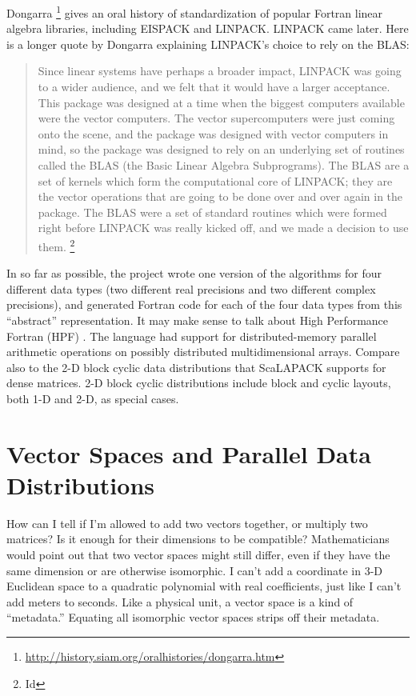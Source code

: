 Dongarra \footnote{\url{http://history.siam.org/oralhistories/dongarra.htm}}
gives an oral history of standardization of popular Fortran linear algebra
libraries, including EISPACK and LINPACK.  LINPACK came later.  Here is a longer
quote by Dongarra explaining LINPACK's choice to rely on the BLAS:

\begin{quote}
  Since linear systems have perhaps a broader impact, LINPACK was
  going to a wider audience, and we felt that it would have a larger acceptance.
  This package was designed at a time when the biggest computers available were
  the vector computers. The vector supercomputers were just coming onto the
  scene, and the package was designed with vector computers in mind, so the
  package was designed to rely on an underlying set of routines called the BLAS
  (the Basic Linear Algebra Subprograms). The BLAS are a set of kernels which
  form the computational core of LINPACK; they are the vector operations that
  are going to be done over and over again in the package. The BLAS were a set
  of standard routines which were formed right before LINPACK was really kicked
  off, and we made a decision to use them. \footnote{Id}
\end{quote}

In so far as possible, the project wrote one version of the algorithms for four
different data types (two different real precisions and two different complex
precisions), and generated Fortran code for each of the four data types from
this “abstract” representation.  It may make sense to talk about High
Performance Fortran (HPF) \cite{Kennedy2007,Kennedy2011}. The language had
support for distributed-memory parallel arithmetic operations on possibly
distributed multidimensional arrays.  Compare also to the 2-D block cyclic data
distributions that ScaLAPACK\cite{Blackford1997} supports for dense matrices.
2-D block cyclic distributions include block and cyclic layouts, both 1-D and
2-D, as special cases.

\section{Vector Spaces and Parallel Data Distributions}

How can I tell if I’m allowed to add two vectors together, or multiply two
matrices?  Is it enough for their dimensions to be compatible?  Mathematicians
would point out that two vector spaces might still differ, even if they have the
same dimension or are otherwise isomorphic.  I can’t add a coordinate in 3-D
Euclidean space to a quadratic polynomial with real coefficients, just like I
can’t add meters to seconds.  Like a physical unit, a vector space is a kind of
“metadata.”  Equating all isomorphic vector spaces strips off their metadata.

